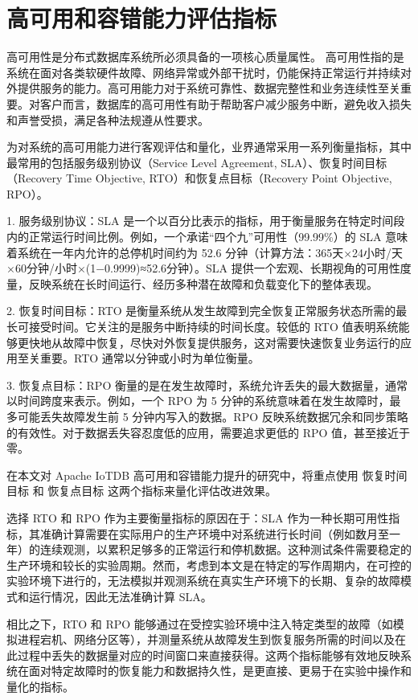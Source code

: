 \section{高可用和容错能力评估指标}

高可用性是分布式数据库系统所必须具备的一项核心质量属性。
高可用性指的是系统在面对各类软硬件故障、网络异常或外部干扰时，仍能保持正常运行并持续对外提供服务的能力。高可用能力对于系统可靠性、数据完整性和业务连续性至关重要。对客户而言，数据库的高可用性有助于帮助客户减少服务中断，避免收入损失和声誉受损，满足各种法规遵从性要求。

为对系统的高可用能力进行客观评估和量化，业界通常采用一系列衡量指标，其中最常用的包括服务级别协议（Service Level Agreement, SLA）、恢复时间目标（Recovery Time Objective, RTO）和恢复点目标（Recovery Point Objective, RPO）。

1. 服务级别协议：SLA 是一个以百分比表示的指标，用于衡量服务在特定时间段内的正常运行时间比例。例如，一个承诺“四个九”可用性（99.99\%）的 SLA 意味着系统在一年内允许的总停机时间约为 52.6 分钟（计算方法：365天×24小时/天×60分钟/小时×(1−0.9999)≈52.6分钟）。SLA 提供一个宏观、长期视角的可用性度量，反映系统在长时间运行、经历多种潜在故障和负载变化下的整体表现。

2. 恢复时间目标：RTO 是衡量系统从发生故障到完全恢复正常服务状态所需的最长可接受时间。它关注的是服务中断持续的时间长度。较低的 RTO 值表明系统能够更快地从故障中恢复，尽快对外恢复提供服务，这对需要快速恢复业务运行的应用至关重要。RTO 通常以分钟或小时为单位衡量。

3. 恢复点目标：RPO 衡量的是在发生故障时，系统允许丢失的最大数据量，通常以时间跨度来表示。例如，一个 RPO 为 5 分钟的系统意味着在发生故障时，最多可能丢失故障发生前 5 分钟内写入的数据。RPO 反映系统数据冗余和同步策略的有效性。对于数据丢失容忍度低的应用，需要追求更低的 RPO 值，甚至接近于零。


在本文对 Apache IoTDB 高可用和容错能力提升的研究中，将重点使用 恢复时间目标 和 恢复点目标 这两个指标来量化评估改进效果。

选择 RTO 和 RPO 作为主要衡量指标的原因在于：SLA 作为一种长期可用性指标，其准确计算需要在实际用户的生产环境中对系统进行长时间（例如数月至一年）的连续观测，以累积足够多的正常运行和停机数据。这种测试条件需要稳定的生产环境和较长的实验周期。然而，考虑到本文是在特定的写作周期内，在可控的实验环境下进行的，无法模拟并观测系统在真实生产环境下的长期、复杂的故障模式和运行情况，因此无法准确计算 SLA。

相比之下，RTO 和 RPO 能够通过在受控实验环境中注入特定类型的故障（如模拟进程宕机、网络分区等），并测量系统从故障发生到恢复服务所需的时间以及在此过程中丢失的数据量对应的时间窗口来直接获得。这两个指标能够有效地反映系统在面对特定故障时的恢复能力和数据持久性，是更直接、更易于在实验中操作和量化的指标。


